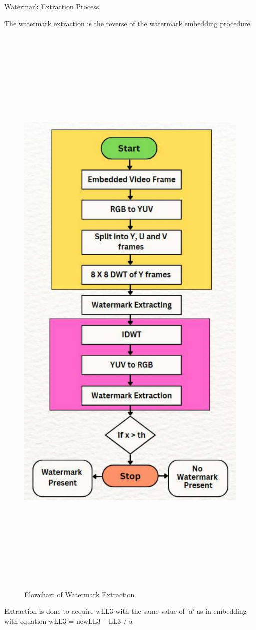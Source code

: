 \documentclass[final]{beamer}
\newlength{\colwidth}
\begin{document}
\begin{frame}[t]
\begin{columns}[t]
\begin{column}{\colwidth}
\begin{block}{Watermark Extraction Process}

 The watermark extraction is the reverse of the 
watermark embedding procedure.

\lipsum
\begin{figure}
    \centering
    \includegraphics[width=1.0\textwidth , height = 37cm]{images and logos/Extraction Algo .pdf}
     \caption{Flowchart of Watermark Extraction}
    \label{fig:img1}
\end{figure}
\lipsum
 Extraction is done to acquire wLL3 with the same 
value of 'a' as in embedding with equation
 wLL3 = newLL3 – LL3 / a


\end{block}
\end{column}
\end{columns}
\end{frame}
\end{document}

